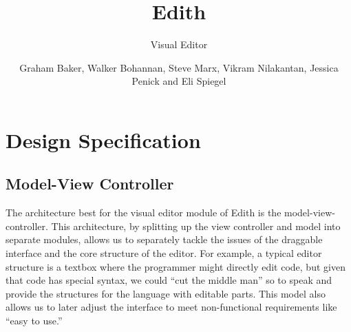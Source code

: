 \documentclass{llncs}
\begin{document}
\title{Edith}


\subtitle{Visual Editor}


\author{Graham Baker, Walker Bohannan, Steve Marx, Vikram Nilakantan, \newline Jessica Penick and Eli Spiegel}








\maketitle


\clearpage

\section{Design Specification}

\subsection{Model-View Controller}
The architecture best for the visual editor module of Edith is the model-view-controller. This architecture, by splitting up the view controller and model into separate modules, allows us to separately tackle the issues of the draggable interface and the core structure of the editor. For example, a typical editor structure is a textbox where the programmer might directly edit code, but given that code has special syntax, we could “cut the middle man” so to speak and provide the structures for the language with editable parts. This model also allows us to later adjust the interface to meet non-functional requirements like “easy to use.”
 
\end{document}
